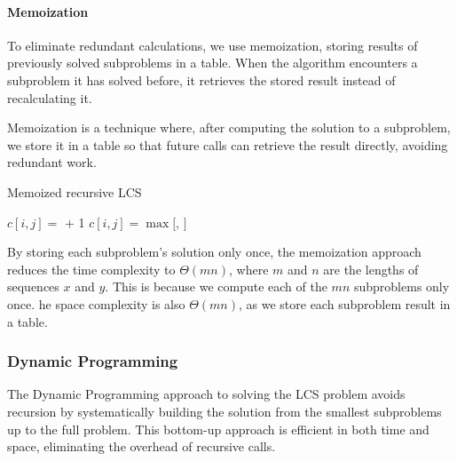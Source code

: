 \paragraph*{Memoization}
To eliminate redundant calculations, we use memoization, storing results of previously solved subproblems in a table.
When the algorithm encounters a subproblem it has solved before, it retrieves the stored result instead of recalculating it.
\begin{definition} 
    Memoization is a technique where, after computing the solution to a subproblem, we store it in a table so that future calls can retrieve the result directly, avoiding redundant work.
\end{definition}
\begin{algorithm}[H]
    \caption{Memoized recursive LCS}
    \begin{algorithmic}
                \State $c[i,j]=$  $+$ 1
            \Else 
                \State $c[i,j]=\max[$, $]$
            \EndIf 
        \EndIf
        \EndProcedure
    \end{algorithmic}
\end{algorithm}  
By storing each subproblem's solution only once, the memoization approach reduces the time complexity to $\Theta(mn)$, where $m$ and $n$ are the lengths of sequences $x$ and $y$.
This is because we compute each of the $mn$ subproblems only once.
he space complexity is also $\Theta(mn)$, as we store each subproblem result in a table.

\subsubsection{Dynamic Programming}
The Dynamic Programming approach to solving the LCS problem avoids recursion by systematically building the solution from the smallest subproblems up to the full problem.
This bottom-up approach is efficient in both time and space, eliminating the overhead of recursive calls.

